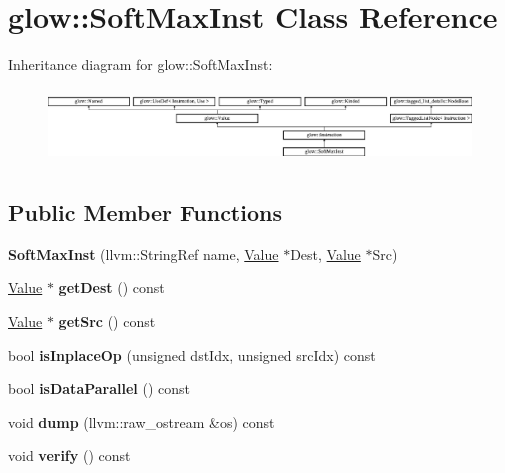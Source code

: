 \hypertarget{classglow_1_1_soft_max_inst}{}\section{glow\+:\+:Soft\+Max\+Inst Class Reference}
\label{classglow_1_1_soft_max_inst}
Inheritance diagram for glow\+:\+:Soft\+Max\+Inst\+:\begin{figure}[H]
\begin{center}
\leavevmode
\includegraphics[height=1.991111cm]{classglow_1_1_soft_max_inst}
\end{center}
\end{figure}
\subsection*{Public Member Functions}
\begin{DoxyCompactItemize}
\item 
\mbox{\label{classglow_1_1_soft_max_inst_abf9fe7ec1cc54eb5b619bb464e96d5ec}} 
{\bfseries Soft\+Max\+Inst} (llvm\+::\+String\+Ref name, \hyperlink{classglow_1_1_value}{Value} $\ast$Dest, \hyperlink{classglow_1_1_value}{Value} $\ast$Src)
\item 
\mbox{\label{classglow_1_1_soft_max_inst_affea9c22ae4abd820057157447d0d732}} 
\hyperlink{classglow_1_1_value}{Value} $\ast$ {\bfseries get\+Dest} () const
\item 
\mbox{\label{classglow_1_1_soft_max_inst_a977c0d7f81381c9f9424af6f9d0079fb}} 
\hyperlink{classglow_1_1_value}{Value} $\ast$ {\bfseries get\+Src} () const
\item 
\mbox{\label{classglow_1_1_soft_max_inst_a0f93d71b0e23d0859ab32bab0a057f18}} 
bool {\bfseries is\+Inplace\+Op} (unsigned dst\+Idx, unsigned src\+Idx) const
\item 
\mbox{\label{classglow_1_1_soft_max_inst_a81ce4236367aefdbfb7d9663a08fa998}} 
bool {\bfseries is\+Data\+Parallel} () const
\item 
\mbox{\label{classglow_1_1_soft_max_inst_ade6c86488985c766c45b4e92687b5cef}} 
void {\bfseries dump} (llvm\+::raw\+\_\+ostream \&os) const
\item 
\mbox{\label{classglow_1_1_soft_max_inst_a8d2b098264fcbad8a89ac39e26c8e9c3}} 
void {\bfseries verify} () const
\end{DoxyCompactItemize}
